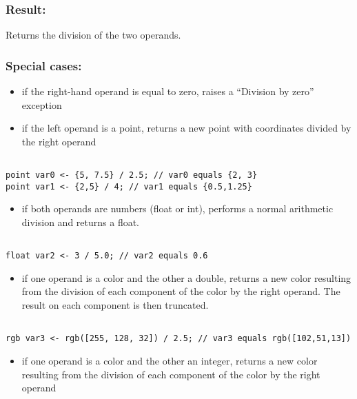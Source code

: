 \documentclass[]{book}
\providecommand{\tightlist}{%
  \setlength{\itemsep}{0pt}\setlength{\parskip}{0pt}}
\theoremstyle{definition}
\theoremstyle{definition}
\theoremstyle{definition}
\theoremstyle{remark}
\begin{document}
\subsubsection{Result:}\label{result-5}

Returns the division of the two operands.

\subsubsection{Special cases:}\label{special-cases-3}

\begin{itemize}
\tightlist
\item
  if the right-hand operand is equal to zero, raises a ``Division by
  zero'' exception\\
\item
  if the left operand is a point, returns a new point with coordinates
  divided by the right operand
\end{itemize}

\begin{verbatim}
 
point var0 <- {5, 7.5} / 2.5; // var0 equals {2, 3} 
point var1 <- {2,5} / 4; // var1 equals {0.5,1.25}
\end{verbatim}

\begin{itemize}
\tightlist
\item
  if both operands are numbers (float or int), performs a normal
  arithmetic division and returns a float.
\end{itemize}

\begin{verbatim}
 
float var2 <- 3 / 5.0; // var2 equals 0.6
\end{verbatim}

\begin{itemize}
\tightlist
\item
  if one operand is a color and the other a double, returns a new color
  resulting from the division of each component of the color by the
  right operand. The result on each component is then truncated.
\end{itemize}

\begin{verbatim}
 
rgb var3 <- rgb([255, 128, 32]) / 2.5; // var3 equals rgb([102,51,13])
\end{verbatim}

\begin{itemize}
\tightlist
\item
  if one operand is a color and the other an integer, returns a new
  color resulting from the division of each component of the color by
  the right operand
\end{itemize}
\end{document}
